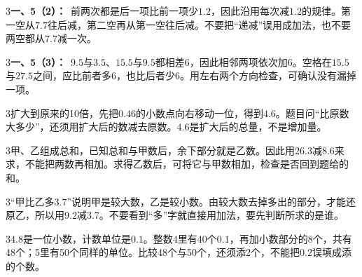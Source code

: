 \documentclass[multi=snippet,border={5bp 20bp 5bp 5bp}]{standalone}
\newenvironment{snippet}[3]{\begin{minipage}{#1bp}\color{answerred}\fontsize{#2}{#3}\selectfont\raggedright}{\end{minipage}}
\begin{document}
\begin{snippet}{505}{11.5}{14}\begin{multicols}{3}\raggedcolumns \textbf{一、5（2）：}\ 前两次都是后一项比前一项少\(1.2\)\allowbreak ，因此沿用每次减\(1.2\)\allowbreak 的规律。第一空从\(7.7\)\allowbreak 往后减，第二空再从第一空往后减。不要把“递减”误用成加法，也不要两空都从\(7.7\)\allowbreak 减一次。\end{multicols}\end{snippet}
\begin{snippet}{505}{11.5}{14}\begin{multicols}{3}\raggedcolumns \textbf{一、5（3）：}\ \(9.5\)\allowbreak 与\(3.5\)\allowbreak 、\(15.5\)\allowbreak 与\(9.5\)\allowbreak 都相差6，因此相邻两项依次加6。空格在\(15.5\)\allowbreak 与\(27.5\)\allowbreak 之间，应比前者多6，也比后者少6。用左右两个方向检查，可确认没有漏掉一项。\end{multicols}\end{snippet}
\begin{snippet}{505}{11.5}{14}\begin{multicols}{3}\raggedcolumns 扩大到原来的10倍，先把\(0.46\)\allowbreak 的小数点向右移动一位，得到\(4.6\)\allowbreak 。题目问“比原数大多少”，还须用扩大后的数减去原数。\(4.6\)\allowbreak 是扩大后的总量，不是增加量。\end{multicols}\end{snippet}
\begin{snippet}{505}{11.5}{14}\begin{multicols}{3}\raggedcolumns 甲、乙组成总和，已知总和与甲数后，余下部分就是乙数。因此用\(26.3\)\allowbreak 减\(8.6\)\allowbreak 来求，不能把两数再相加。求得乙数后，可将它与甲数相加，检查是否回到题给的和。\end{multicols}\end{snippet}
\begin{snippet}{505}{11.5}{14}\begin{multicols}{3}\raggedcolumns “甲比乙多\(3.7\)\allowbreak ”说明甲是较大数，乙是较小数。由较大数去掉多出的部分，才能还原乙，所以用\(9.2\)\allowbreak 减\(3.7\)\allowbreak 。不要看到“多”字就直接用加法，要先判断所求的是谁。\end{multicols}\end{snippet}
\begin{snippet}{505}{11.5}{14}\begin{multicols}{3}\raggedcolumns \(4.8\)\allowbreak 是一位小数，计数单位是\(0.1\)\allowbreak 。整数4里有40个\(0.1\)\allowbreak ，再加小数部分的8个，共有48个；5里有50个同样的单位。比较48个与50个，还须添2个，不能把\(0.2\)\allowbreak 误填成添的个数。\end{multicols}\end{snippet}
\end{document}
